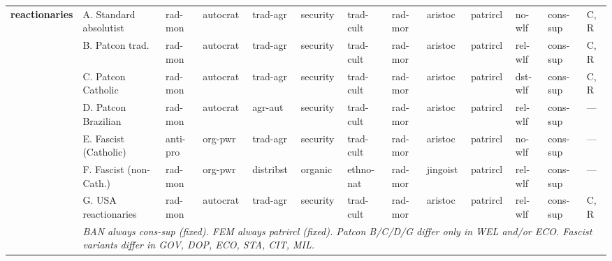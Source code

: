 \documentclass[a4paper]{article}
\newcommand{\nd}{---}
\newcommand{\minorrow}[2]{\rowcolor{minorRow} #1 & \multicolumn{12}{p{22cm}|}{\textit{#2}} \\}
\begin{document}
\begin{footnotesize}
\begin{longtable}{|p{1.8cm}|p{2.3cm}|p{1.55cm}|p{1.65cm}|p{1.65cm}|p{1.3cm}|p{1.5cm}|p{1.5cm}|p{1.5cm}|p{1.3cm}|p{1.45cm}|p{1.0cm}|p{2.65cm}|}
\multirow{8}{*}{\cellcolor{rightHdr}\textbf{reaction\-aries}} &
  A. Standard absolutist & rad-mon & autocrat & trad-agr & security & trad-cult & rad-mor & aristoc & patrircl & no-wlf & cons-sup & C, R \\ \cline{2-13}
\cellcolor{rightHdr} &
  B. Patcon trad. & rad-mon & autocrat & trad-agr & security & trad-cult & rad-mor & aristoc & patrircl & rel-wlf & cons-sup & C, R \\ \cline{2-13}
\cellcolor{rightHdr} &
  C. Patcon Catholic & rad-mon & autocrat & trad-agr & security & trad-cult & rad-mor & aristoc & patrircl & dst-wlf & cons-sup & C, R \\ \cline{2-13}
\cellcolor{rightHdr} &
  D. Patcon Brazilian & rad-mon & autocrat & agr-aut & security & trad-cult & rad-mor & aristoc & patrircl & rel-wlf & cons-sup & \nd \\ \cline{2-13}
\cellcolor{rightHdr} &
  E. Fascist (Catholic) & anti-pro & org-pwr & trad-agr & security & trad-cult & rad-mor & aristoc & patrircl & no-wlf & cons-sup & \nd \\ \cline{2-13}
\cellcolor{rightHdr} &
  F. Fascist (non-Cath.) & rad-mon & org-pwr & distribst & organic & ethno-nat & rad-mor & jingoist & patrircl & rel-wlf & cons-sup & \nd \\ \cline{2-13}
\cellcolor{rightHdr} &
  G. USA reactionaries & rad-mon & autocrat & trad-agr & security & trad-cult & rad-mor & aristoc & patrircl & rel-wlf & cons-sup & C, R \\ \cline{2-13}
\minorrow{\cellcolor{rightHdr}}{BAN always cons-sup (fixed). FEM always patrircl (fixed). Patcon B/C/D/G differ only in WEL and/or ECO. Fascist variants differ in GOV, DOP, ECO, STA, CIT, MIL.}
\hline


\end{longtable}
\end{footnotesize}
\end{document}
